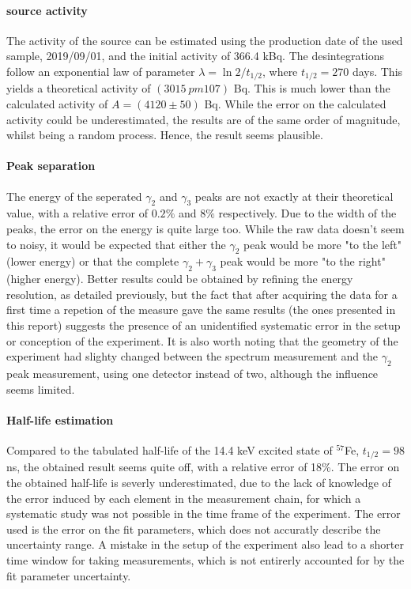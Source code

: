 \paragraph{\cobalt source activity}
The activity of the source can be estimated using the production date of the used sample, 2019/09/01, and the initial activity of 366.4 kBq. The desintegrations follow an exponential law of parameter \(\lambda = \ln 2 / t_{1/2}\), where \(t_{1/2} = 270\) days. This yields a theoretical activity of \((3015 \ pm 107)\) Bq. This is much lower than the calculated activity of \(A = (4120 \pm 50)\) Bq. While the error on the calculated activity could be underestimated, the results are of the same order of magnitude, whilst being a random process. Hence, the result seems plausible.

\paragraph{Peak separation}
The energy of the seperated \(\gamma_2\) and \(\gamma_3\) peaks are not exactly at their theoretical value, with a relative error of \(0.2\%\) and \(8\%\) respectively. 
Due to the width of the peaks, the error on the energy is quite large too. 
While the raw data doesn't seem to noisy, it would be expected that either the \(\gamma_2\) peak would be more "to the left" (lower energy) or that the complete \(\gamma_2+\gamma_3\) peak would be more "to the right" (higher energy). 
Better results could be obtained by refining the energy resolution, as detailed previously, but the fact that after acquiring the data for a first time a repetion of the measure gave the same results (the ones presented in this report) suggests the presence of an unidentified systematic error in the setup or conception of the experiment. 
It is also worth noting that the geometry of the experiment had slighty changed between the spectrum measurement and the \(\gamma_2\) peak measurement, using one detector instead of two, although the influence seems limited.

\paragraph{Half-life estimation}
Compared to the tabulated half-life of the 14.4 keV excited state of $^{57}$Fe, \(t_{1/2} = 98\) ns, the obtained result seems quite off, with a relative error of 18\%. The error on the obtained half-life is severly underestimated, due to the lack of knowledge of the error induced by each element in the measurement chain, for which a systematic study was not possible in the time frame of the experiment. The error used is the error on the fit parameters, which does not accuratly describe the uncertainty range. A mistake in the setup of the experiment also lead to a shorter time window for taking measurements, which is not entirerly accounted for by the fit parameter uncertainty.
